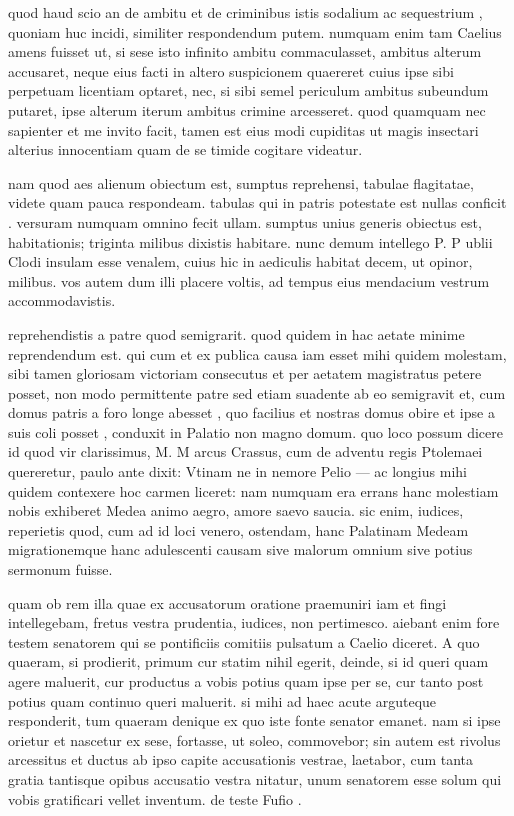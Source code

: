  quod haud scio an de ambitu et de criminibus istis sodalium ac sequestrium , quoniam huc incidi, similiter respondendum putem. numquam enim tam Caelius amens fuisset ut, si sese isto infinito ambitu commaculasset, ambitus alterum accusaret, neque eius facti in altero suspicionem quaereret cuius ipse sibi perpetuam licentiam optaret, nec, si sibi semel periculum ambitus subeundum putaret, ipse alterum iterum ambitus crimine arcesseret. quod quamquam nec sapienter et me invito facit, tamen est eius modi cupiditas ut magis insectari alterius innocentiam quam de se timide cogitare videatur.

 nam quod aes alienum obiectum est, sumptus reprehensi, tabulae flagitatae, videte quam pauca respondeam. tabulas qui in patris potestate est nullas conficit . versuram numquam omnino fecit ullam. sumptus unius generis obiectus est, habitationis; triginta milibus dixistis habitare. nunc demum intellego P. P ublii Clodi insulam esse venalem, cuius hic in aediculis habitat decem, ut opinor, milibus. vos autem dum illi placere voltis, ad tempus eius mendacium vestrum accommodavistis.

 reprehendistis a patre quod semigrarit. quod quidem in hac aetate minime reprendendum est. qui cum et ex publica causa iam esset mihi quidem molestam, sibi tamen gloriosam victoriam consecutus et per aetatem magistratus petere posset, non modo permittente patre sed etiam suadente ab eo semigravit et, cum domus patris a foro longe abesset , quo facilius et nostras domus obire et ipse a suis coli posset , conduxit in Palatio non magno domum. quo loco possum dicere id quod vir clarissimus, M. M arcus Crassus, cum de adventu regis Ptolemaei quereretur, paulo ante dixit: Vtinam ne in nemore Pelio — ac longius mihi quidem contexere hoc carmen liceret: nam numquam era errans hanc molestiam nobis exhiberet Medea animo aegro, amore saevo saucia. sic enim, iudices, reperietis quod, cum ad id loci venero, ostendam, hanc Palatinam Medeam migrationemque hanc adulescenti causam sive malorum omnium sive potius sermonum fuisse.

 quam ob rem illa quae ex accusatorum oratione praemuniri iam et fingi intellegebam, fretus vestra prudentia, iudices, non pertimesco. aiebant enim fore testem senatorem qui se pontificiis comitiis pulsatum a Caelio diceret. A quo quaeram, si prodierit, primum cur statim nihil egerit, deinde, si id queri quam agere maluerit, cur productus a vobis potius quam ipse per se, cur tanto post potius quam continuo queri maluerit. si mihi ad haec acute arguteque responderit, tum quaeram denique ex quo iste fonte senator emanet. nam si ipse orietur et nascetur ex sese, fortasse, ut soleo, commovebor; sin autem est rivolus arcessitus et ductus ab ipso capite accusationis vestrae, laetabor, cum tanta gratia tantisque opibus accusatio vestra nitatur, unum senatorem esse solum qui vobis gratificari vellet inventum. de teste Fufio .

